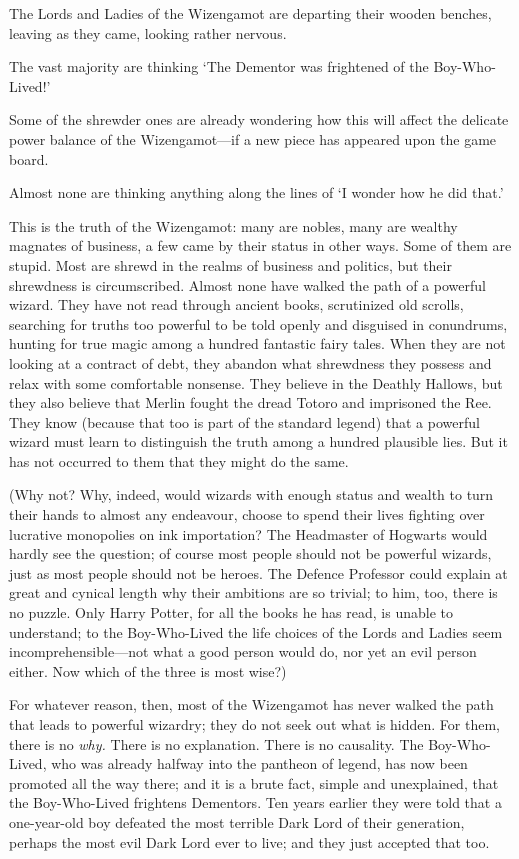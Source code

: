 \later

The Lords and Ladies of the Wizengamot are departing their wooden benches, leaving as they came, looking rather nervous.

The vast majority are thinking ‘The Dementor was frightened of the Boy-Who-Lived!’

Some of the shrewder ones are already wondering how this will affect the delicate power balance of the Wizengamot—if a new piece has appeared upon the game board.

Almost none are thinking anything along the lines of ‘I wonder how he did that.’

This is the truth of the Wizengamot: many are nobles, many are wealthy magnates of business, a few came by their status in other ways. Some of them are stupid. Most are shrewd in the realms of business and politics, but their shrewdness is circumscribed. Almost none have walked the path of a powerful wizard. They have not read through ancient books, scrutinized old scrolls, searching for truths too powerful to be told openly and disguised in conundrums, hunting for true magic among a hundred fantastic fairy tales. When they are not looking at a contract of debt, they abandon what shrewdness they possess and relax with some comfortable nonsense. They believe in the Deathly Hallows, but they also believe that Merlin fought the dread Totoro and imprisoned the Ree. They know (because that too is part of the standard legend) that a powerful wizard must learn to distinguish the truth among a hundred plausible lies. But it has not occurred to them that they might do the same.

(Why not? Why, indeed, would wizards with enough status and wealth to turn their hands to almost any endeavour, choose to spend their lives fighting over lucrative monopolies on ink importation? The Headmaster of Hogwarts would hardly see the question; of course most people should not be powerful wizards, just as most people should not be heroes. The Defence Professor could explain at great and cynical length why their ambitions are so trivial; to him, too, there is no puzzle. Only Harry Potter, for all the books he has read, is unable to understand; to the Boy-Who-Lived the life choices of the Lords and Ladies seem incomprehensible—not what a good person would do, nor yet an evil person either. Now which of the three is most wise?)

For whatever reason, then, most of the Wizengamot has never walked the path that leads to powerful wizardry; they do not seek out what is hidden. For them, there is no \emph{why.} There is no explanation. There is no causality. The Boy-Who-Lived, who was already halfway into the pantheon of legend, has now been promoted all the way there; and it is a brute fact, simple and unexplained, that the Boy-Who-Lived frightens Dementors. Ten years earlier they were told that a one-year-old boy defeated the most terrible Dark Lord of their generation, perhaps the most evil Dark Lord ever to live; and they just accepted that too.

